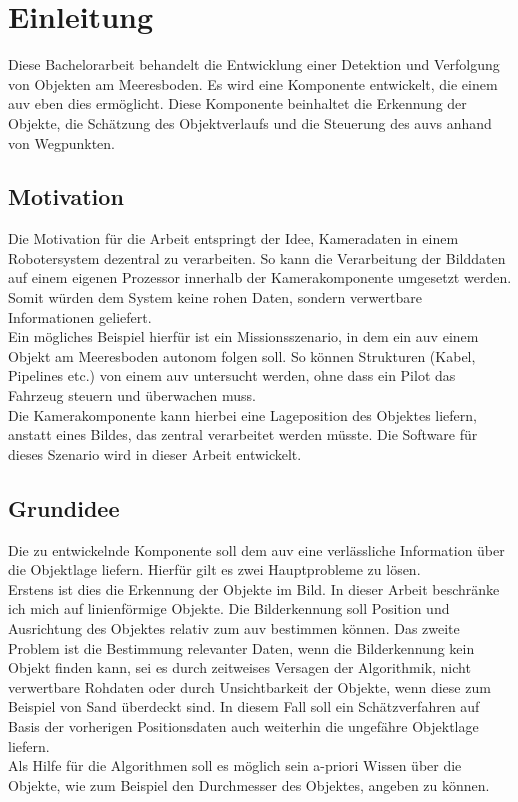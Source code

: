 \section{Einleitung}
Diese Bachelorarbeit behandelt die Entwicklung einer Detektion und Verfolgung von Objekten am Meeresboden. Es wird eine Komponente entwickelt, die einem \gls{auv} eben dies ermöglicht. Diese Komponente beinhaltet die Erkennung der Objekte, die Schätzung des Objektverlaufs und die Steuerung des \gls{auv}s anhand von Wegpunkten.
\subsection{Motivation}
Die Motivation für die Arbeit entspringt der Idee, Kameradaten in einem Robotersystem dezentral zu verarbeiten. So kann die Verarbeitung der Bilddaten auf einem eigenen Prozessor innerhalb der Kamerakomponente umgesetzt werden. Somit würden dem System keine rohen Daten, sondern verwertbare Informationen geliefert.\\
Ein mögliches Beispiel hierfür ist ein Missionsszenario, in dem ein \gls{auv} einem Objekt am Meeresboden autonom folgen soll. So können Strukturen (Kabel, Pipelines etc.) von einem \gls{auv} untersucht werden, ohne dass ein Pilot das Fahrzeug steuern und überwachen muss.\\
Die Kamerakomponente kann hierbei eine Lageposition des Objektes liefern, anstatt eines Bildes, das zentral verarbeitet werden müsste. Die Software für dieses Szenario wird in dieser Arbeit entwickelt.\\

\subsection{Grundidee}
Die zu entwickelnde Komponente soll dem \gls{auv} eine verlässliche Information über die Objektlage liefern. Hierfür gilt es zwei Hauptprobleme zu lösen.\\
Erstens ist dies die Erkennung der Objekte im Bild. In dieser Arbeit beschränke ich mich auf linienförmige Objekte. Die Bilderkennung soll Position und Ausrichtung des Objektes relativ zum \gls{auv} bestimmen können.
Das zweite Problem ist die Bestimmung relevanter Daten, wenn die Bilderkennung kein Objekt finden kann, sei es durch zeitweises Versagen der Algorithmik, nicht verwertbare Rohdaten oder durch Unsichtbarkeit der Objekte, wenn diese zum Beispiel von Sand überdeckt sind.
In diesem Fall soll ein Schätzverfahren auf Basis der vorherigen Positionsdaten auch weiterhin die ungefähre Objektlage liefern.\\
Als Hilfe für die Algorithmen soll es möglich sein a-priori Wissen über die Objekte, wie zum Beispiel den Durchmesser des Objektes, angeben zu können.
